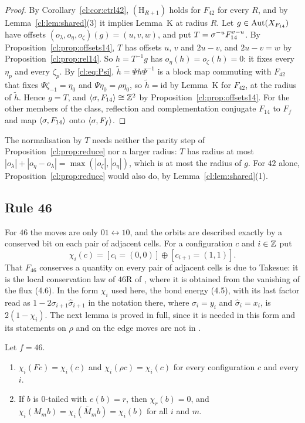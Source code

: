 \begin{proof}
By Corollary~\ref{cl:cor:ctrl42}, $(\mathrm H_{R+1})$ holds for $F_{42}$ for every $R$, and by Lemma~\ref{cl:lem:shared}(3) it implies Lemma~K at radius $R$. Let $g\in\operatorname{Aut}(X_{F_{14}})$ have offsets $(o_\lambda,o_\eta,o_\zeta)(g)=(u,v,w)$, and put $T=\sigma^{-u}F_{14}^{v-u}$. By Proposition~\ref{cl:prop:offsets14}, $T$ has offsets $u$, $v$ and $2u-v$, and $2u-v=w$ by Proposition~\ref{cl:prop:rel14}. So $h=T^{-1}g$ has $o_\eta(h)=o_\zeta(h)=0$: it fixes every $\eta_p$ and every $\zeta_p$. By \eqref{cl:eq:Psi}, $\tilde h=\Psi h\Psi^{-1}$ is a block map commuting with $F_{42}$ that fixes $\Psi\zeta_{-1}=\eta_0$ and $\Psi\eta_0=\rho\eta_0$, so $\tilde h=\mathrm{id}$ by Lemma~K for $F_{42}$, at the radius of $\tilde h$. Hence $g=T$, and $\langle\sigma,F_{14}\rangle\cong\mathbb{Z}^2$ by Proposition~\ref{cl:prop:offsets14}. For the other members of the class, reflection and complementation conjugate $F_{14}$ to $F_f$ and map $\langle\sigma,F_{14}\rangle$ onto $\langle\sigma,F_f\rangle$.
\end{proof}

The normalisation by $T$ needs neither the parity step of Proposition~\ref{cl:prop:reduce} nor a larger radius: $T$ has radius at most $|o_\lambda|+|o_\eta-o_\lambda|=\max(|o_\zeta|,|o_\eta|)$, which is at most the radius of $g$. For $42$ alone, Proposition~\ref{cl:prop:reduce} would also do, by Lemma~\ref{cl:lem:shared}(1).

\subsection{Rule 46}\label{cl:sec:46}

For $46$ the moves are only $01\leftrightarrow10$, and the orbits are described exactly by a conserved bit on each pair of adjacent cells. For a configuration $c$ and $i\in\mathbb{Z}$ put
\[
\chi_i(c)=[c_i=(0,0)]\oplus[c_{i+1}=(1,1)].
\]
That $F_{46}$ conserves a quantity on every pair of adjacent cells is due to Takesue: it is the local conservation law of $46$R of \cite[(4.4)--(4.6)]{Takesue1989}, where it is obtained from the vanishing of the flux (4.6). In the form $\chi_i$ used here, the bond energy (4.5), with its last factor read as $1-2\sigma_{i+1}\hat\sigma_{i+1}$ in the notation there, where $\sigma_i=y_i$ and $\hat\sigma_i=x_i$, is $2(1-\chi_i)$. The next lemma is proved in full, since it is needed in this form and its statements on $\rho$ and on the edge moves are not in \cite{Takesue1989}.

\begin{lemma}\label{cl:lem:bond}
Let $f=46$.
\begin{enumerate}
\item $\chi_i(Fc)=\chi_i(c)$ and $\chi_i(\rho c)=\chi_i(c)$ for every configuration $c$ and every $i$.
\item If $b$ is $0$-tailed with $e(b)=r$, then $\chi_r(b)=0$, and $\chi_i(M_mb)=\chi_i(\bar M_mb)=\chi_i(b)$ for all $i$ and $m$.
\end{enumerate}
\end{lemma}

